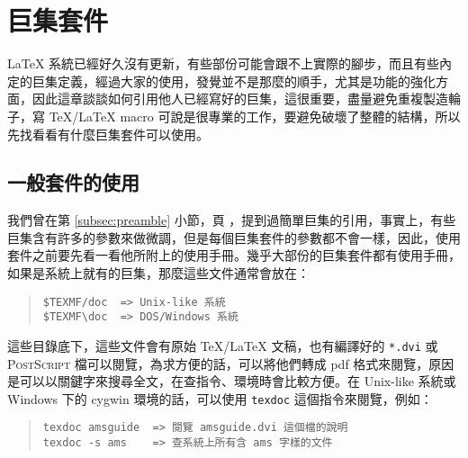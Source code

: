 
\chapter{巨集套件}
\label{ch:package}

\LaTeX{} 系統已經好久沒有更新，有些部份可能會跟不上實際的腳步，而且有些內定的巨集定義，經過大家的使用，發覺並不是那麼的順手，尤其是功能的強化方面，因此這章談談如何引用他人已經寫好的巨集，這很重要，盡量避免重複製造輪子，寫 \TeX{}/\LaTeX{} macro 可說是很專業的工作，要避免破壞了整體的結構，所以先找看看有什麼巨集套件可以使用。


\section{一般套件的使用}

我們曾在第 \ref{subsec:preamble} 小節，頁 \pageref{subsec:preamble}，提到過簡單巨集的引用，事實上，有些巨集含有許多的參數來做微調，但是每個巨集套件的參數都不會一樣，因此，使用套件之前要先看一看他所附上的使用手冊。幾乎大部份的巨集套件都有使用手冊，如果是系統上就有的巨集，那麼這些文件通常會放在：

\begin{quote}
  \begin{verbatim}
$TEXMF/doc  => Unix-like 系統
$TEXMF\doc  => DOS/Windows 系統
\end{verbatim}
\end{quote}

這些目錄底下，這些文件會有原始 \TeX/\LaTeX{} 文稿，也有編譯好的 \texttt{*.dvi} 或 \textsc{PostScript} 檔可以閱覽，為求方便的話，可以將他們轉成 pdf 格式來閱覽，原因是可以以關鍵字來搜尋全文，在查指令、環境時會比較方便。在 Unix-like 系統或 Windows 下的 cygwin 環境的話，可以使用 \texttt{texdoc} 這個指令來閱覽，例如：

\begin{quote}
  \begin{verbatim}
texdoc amsguide  => 閱覽 amsguide.dvi 這個檔的說明
texdoc -s ams    => 查系統上所有含 ams 字樣的文件
\end{verbatim}
\end{quote}



